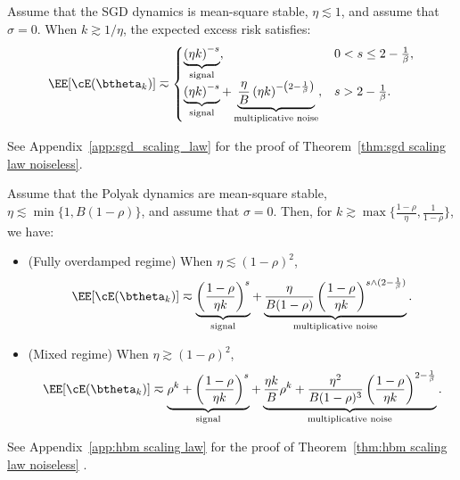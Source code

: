 \begin{theorem}
\label{thm:sgd scaling law noiseless}
Assume that the SGD dynamics is mean-square stable, \(\eta\lesssim1\), and assume that \(\sigma=0\). When \(k \gtrsim 1/\eta\), the expected excess risk satisfies:
\begin{equation}
\label{eq:sgd_loss_noiseless}
\EE[\cE(\btheta_k)]
\eqsim
\begin{cases}
\underbrace{ \left(\eta k\right)^{-s} }_{\text{signal}}, & 0 < s \le 2-\frac{1}{\beta}, \\[12pt]
\underbrace{ \left(\eta k\right)^{-s} }_{\text{signal}} + \underbrace{ \frac{\eta}{B}\left(\eta k\right)^{-\left(2-\frac{1}{\beta}\right)} }_{\text{multiplicative noise}}, & s > 2-\frac{1}{\beta}.
\end{cases}
\end{equation}
\end{theorem}
See Appendix~\ref{app:sgd_scaling_law} for the proof of Theorem~\ref{thm:sgd scaling law noiseless}.

\begin{theorem}
\label{thm:hbm scaling law noiseless}
Assume that the Polyak dynamics are mean-square stable, $\eta\lesssim\min\{1,B(1-\rho)\}$, and assume that \(\sigma=0\). Then, for $k\gtrsim\max\{\frac{1-\rho}{\eta},\frac{1}{1-\rho}\}$, we have:
\begin{itemize}
\item (Fully overdamped regime) When \(\eta\lesssim(1-\rho)^2\),
\begin{equation}
\label{eq:hb-loss-overdamped-noiseless}
\EE[\cE(\btheta_k)]
\eqsim
\underbrace{
\left(\frac{1-\rho}{\eta k}\right)^s
}_{\text{signal}}
+
\underbrace{
\frac{\eta}{B(1-\rho)}\left(\frac{1-\rho}{\eta k}\right)^{s\wedge (2-\frac 1\beta)}
}_{\text{multiplicative noise}}.
\end{equation}
\vspace{-1em}
\item (Mixed regime) When \(\eta\gtrsim(1-\rho)^2\),
\begin{equation}
\label{eq:hb-loss-mixed-noiseless}
\EE[\cE(\btheta_k)]
\eqsim
\underbrace{\rho^k+\left(\frac{1-\rho}{\eta k}\right)^s}_{\text{signal}}
+
\underbrace{\frac{\eta k}{B}\rho^k+\frac{\eta^2}{B(1-\rho)^3}\left(\frac{1-\rho}{\eta k}\right)^{2-\frac{1}{\beta}}}_{\text{multiplicative noise}}.
\vspace{-0.5em}
\end{equation}
\end{itemize}
\end{theorem}
See Appendix~\ref{app:hbm scaling law} for the proof of Theorem~\ref{thm:hbm scaling law noiseless} .

